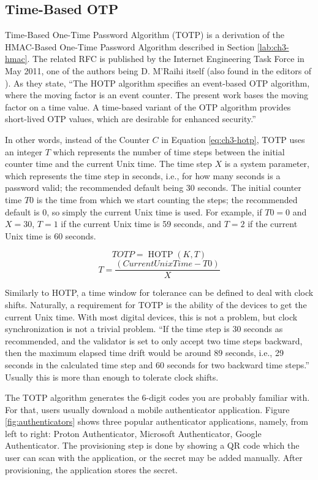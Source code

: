 \subsection{Time-Based OTP}
Time-Based One-Time Password Algorithm (TOTP) is a derivation of the HMAC-Based One-Time Password Algorithm described in Section \ref{lab:ch3-hmac}.
The related RFC is published by the Internet Engineering Task Force in May 2011\cite{totp}, one of the authors being D. M'Raihi itself (also found in the editors of \cite{hotp}).
As they state, ``The HOTP algorithm specifies an event-based OTP algorithm, where the moving factor is an event counter.
The present work bases the moving factor on a time value.
A time-based variant of the OTP algorithm provides short-lived OTP values, which are desirable for enhanced security.''

In other words, instead of the Counter $C$ in Equation \ref{eq:ch3-hotp}, TOTP uses an integer $T$ which represents the number of time steps between the initial counter time and the current Unix time.
The time step $X$ is a system parameter, which represents the time step in seconds, i.e., for how many seconds is a password valid; the recommended default being 30 seconds.
The initial counter time $T0$ is the time from which we start counting the steps; the recommended default is 0, so simply the current Unix time is used.
For example, if $T0 = 0$ and $X = 30$, $T = 1$ if the current Unix time is 59 seconds, and $T = 2$ if the current Unix time is 60 seconds.

\begin{equation}
TOTP = \operatorname{HOTP}(K, T)
\end{equation}
\begin{equation}
T = \frac{(CurrentUnixTime - T0)}{X}
\end{equation}

Similarly to HOTP, a time window for tolerance can be defined to deal with clock shifts.
Naturally, a requirement for TOTP is the ability of the devices to get the current Unix time.
With most digital devices, this is not a problem, but clock synchronization is not a trivial problem.
``If the time step is 30 seconds as recommended, and the validator is set to only accept two time steps backward, then the maximum elapsed time drift would be around 89 seconds, i.e., 29 seconds in the calculated time step and 60 seconds for two backward time steps.''
Usually this is more than enough to tolerate clock shifts.

The TOTP algorithm generates the 6-digit codes you are probably familiar with.
For that, users usually download a mobile authenticator application.
Figure \ref{fig:authenticators} shows three popular authenticator applications, namely, from left to right: Proton Authenticator, Microsoft Authenticator, Google Authenticator.
The provisioning step is done by showing a QR code which the user can scan with the application, or the secret may be added manually.
After provisioning, the application stores the secret.

